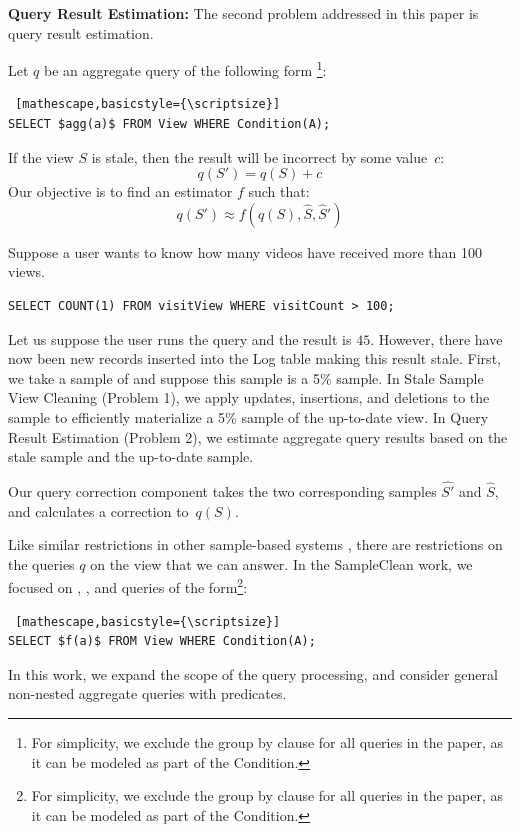 \noindent\textbf{Query Result Estimation: }
The second problem addressed in this paper is query result estimation.
\begin{problem}
Let $q$ be an aggregate query of the following form \footnote{\scriptsize For simplicity, we exclude the group by clause for all queries in the paper, as it can be modeled as part of the \textsf{Condition}.}:
\begin{lstlisting} [mathescape,basicstyle={\scriptsize}]
SELECT $agg(a)$ FROM View WHERE Condition(A);
\end{lstlisting}
If the view $S$ is stale, then the result will be incorrect by some value~$c$:
\[
q(S') = q(S) + c
\]
Our objective is to find an estimator $f$ such that:
\[
q(S') \approx f(q(S),\widehat{S},\widehat{S}')
\] 
\end{problem}

\begin{example}\label{infexample}
Suppose a user wants to know how many videos have received more than 100 views.
\begin{lstlisting}[basicstyle={\scriptsize}]
SELECT COUNT(1) FROM visitView WHERE visitCount > 100;
\end{lstlisting}
Let us suppose the user runs the query and the result is $45$.
However, there have now been new records inserted into the Log table making this result stale. %
First, we take a sample of  and suppose this sample is a 5\% sample.
In Stale Sample View Cleaning (Problem 1), we apply updates, insertions, and deletions to the sample to efficiently materialize a 5\%  sample of the up-to-date view.
In Query Result Estimation (Problem 2), we estimate aggregate query results based on the stale sample and the up-to-date sample.
\end{example}

\iffalse
Our query correction component takes the two corresponding samples $\widehat{S'}$ and $\widehat{S}$, and calculates a correction to~$q(S)$.

Like similar restrictions in other sample-based systems \cite{agarwalknowing}, there are restrictions on the queries $q$ on the view that we can answer. 
In the SampleClean work, we focused on \sumfunc, \countfunc, and \avgfunc queries of the form\footnote{\scriptsize For simplicity, we exclude the group by clause for all queries in the paper, as it can be modeled as part of the \textsf{Condition}.}: 
\begin{lstlisting} [mathescape,basicstyle={\scriptsize}]
SELECT $f(a)$ FROM View WHERE Condition(A);
\end{lstlisting}
In this work, we expand the scope of the query processing, and consider general non-nested aggregate queries with predicates.

